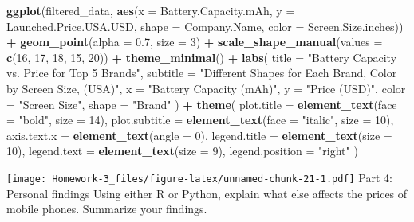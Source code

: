 \documentclass[
]{article}
\newenvironment{Shaded}{\begin{snugshade}}{\end{snugshade}}
\newcommand{\AttributeTok}[1]{\textcolor[rgb]{0.13,0.29,0.53}{#1}}
\newcommand{\DecValTok}[1]{\textcolor[rgb]{0.00,0.00,0.81}{#1}}
\newcommand{\FloatTok}[1]{\textcolor[rgb]{0.00,0.00,0.81}{#1}}
\newcommand{\FunctionTok}[1]{\textcolor[rgb]{0.13,0.29,0.53}{\textbf{#1}}}
\newcommand{\NormalTok}[1]{#1}
\newcommand{\SpecialCharTok}[1]{\textcolor[rgb]{0.81,0.36,0.00}{\textbf{#1}}}
\newcommand{\StringTok}[1]{\textcolor[rgb]{0.31,0.60,0.02}{#1}}
\begin{document}
\begin{Shaded}
\begin{Highlighting}[]
\FunctionTok{ggplot}\NormalTok{(filtered\_data, }\FunctionTok{aes}\NormalTok{(}\AttributeTok{x =}\NormalTok{ Battery.Capacity.mAh, }
                          \AttributeTok{y =}\NormalTok{ Launched.Price.USA.USD, }
                          \AttributeTok{shape =}\NormalTok{ Company.Name,  }
                          \AttributeTok{color =}\NormalTok{ Screen.Size.inches)) }\SpecialCharTok{+}  
  \FunctionTok{geom\_point}\NormalTok{(}\AttributeTok{alpha =} \FloatTok{0.7}\NormalTok{, }\AttributeTok{size =} \DecValTok{3}\NormalTok{) }\SpecialCharTok{+}  
  \FunctionTok{scale\_shape\_manual}\NormalTok{(}\AttributeTok{values =} \FunctionTok{c}\NormalTok{(}\DecValTok{16}\NormalTok{, }\DecValTok{17}\NormalTok{, }\DecValTok{18}\NormalTok{, }\DecValTok{15}\NormalTok{, }\DecValTok{20}\NormalTok{)) }\SpecialCharTok{+}
  \FunctionTok{theme\_minimal}\NormalTok{() }\SpecialCharTok{+}
  \FunctionTok{labs}\NormalTok{(}
    \AttributeTok{title =} \StringTok{"Battery Capacity vs. Price for Top 5 Brands"}\NormalTok{,}
    \AttributeTok{subtitle =} \StringTok{"Different Shapes for Each Brand, Color by Screen Size, (USA)"}\NormalTok{,}
    \AttributeTok{x =} \StringTok{"Battery Capacity (mAh)"}\NormalTok{,}
    \AttributeTok{y =} \StringTok{"Price (USD)"}\NormalTok{,}
    \AttributeTok{color =} \StringTok{"Screen Size"}\NormalTok{,}
    \AttributeTok{shape =} \StringTok{"Brand"}
\NormalTok{  ) }\SpecialCharTok{+}
  \FunctionTok{theme}\NormalTok{(}
    \AttributeTok{plot.title =} \FunctionTok{element\_text}\NormalTok{(}\AttributeTok{face =} \StringTok{"bold"}\NormalTok{, }\AttributeTok{size =} \DecValTok{14}\NormalTok{),  }
    \AttributeTok{plot.subtitle =} \FunctionTok{element\_text}\NormalTok{(}\AttributeTok{face =} \StringTok{"italic"}\NormalTok{, }\AttributeTok{size =} \DecValTok{10}\NormalTok{),  }
    \AttributeTok{axis.text.x =} \FunctionTok{element\_text}\NormalTok{(}\AttributeTok{angle =} \DecValTok{0}\NormalTok{),  }
    \AttributeTok{legend.title =} \FunctionTok{element\_text}\NormalTok{(}\AttributeTok{size =} \DecValTok{10}\NormalTok{),}
    \AttributeTok{legend.text =} \FunctionTok{element\_text}\NormalTok{(}\AttributeTok{size =} \DecValTok{9}\NormalTok{),}
    \AttributeTok{legend.position =} \StringTok{"right"}
\NormalTok{  )}
\end{Highlighting}
\end{Shaded}

\texttt{[image: Homework-3\_files/figure-latex/unnamed-chunk-21-1.pdf]}
Part 4: Personal findings Using either R or Python, explain what else
affects the prices of mobile phones. Summarize your findings.
\end{document}
